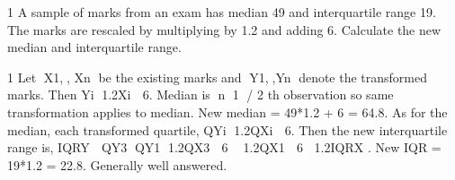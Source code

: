 \documentclass[a4paper,12pt]{article}
\begin{document}
1 A sample of marks from an exam has median 49 and interquartile range 19. The
marks are rescaled by multiplying by 1.2 and adding 6.
Calculate the new median and interquartile range. 

1 Let X1,, Xn be the existing marks and Y1,,Yn denote the transformed marks.
Then Yi 1.2Xi  6.
Median is n 1 / 2 th observation so same transformation applies to median.
New median = 49*1.2 + 6 = 64.8.
As for the median, each transformed quartile, QYi 1.2QXi  6. Then the new
interquartile range is, IQRY  QY3 QY1 1.2QX3  6  1.2QX1  6 1.2IQRX .
New IQR = 19*1.2 = 22.8. 
Generally well answered.
\end{document}
